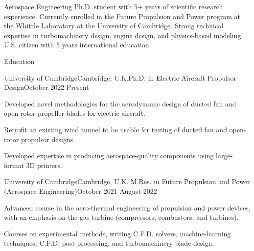 \documentclass{resume} %
\begin{document}


    Aerospace Engineering Ph.D. student with 5+ years of scientific research experience. Currently enrolled in the Future Propulsion and Power program at the Whittle Laboratory at the University of Cambridge. Strong technical expertise in turbomachinery design, engine design, and physics-based modeling.  U.S. citizen with 5 years international education.




\begin{rSection}{Education}
\begin{rSubsection}
    {University of Cambridge}{Cambridge, U.K.}{Ph.D. in Electric Aircraft Propulsor Design}{October 2022 {\textendash}  Present}
    \item Developed novel methodologies for the aerodynamic design of ducted fan and open-rotor propeller blades for electric aircraft.
    \item Retrofit an existing wind tunnel to be usable for testing of ducted fan and open-rotor propulsor designs. 
    \item Developed expertise in producing aerospace-quality components using large-format 3D printers.
    


    
\end{rSubsection}
\begin{rSubsection}{University of Cambridge}{Cambridge, U.K.}{ M.Res. in Future Propulsion and Power (Aerospace Engineering)}{October 2021 {\textendash}  August 2022}
\item  Advanced course in the aero-thermal engineering of propulsion and power devices, with an emphasis on the gas turbine (compressors, combustors, and turbines).
    \item Courses on experimental methods, writing C.F.D. solvers, machine-learning techniques, C.F.D. post-processing, and turbomachinery blade design.
\end{rSubsection}



\end{rSection}
\end{document}

